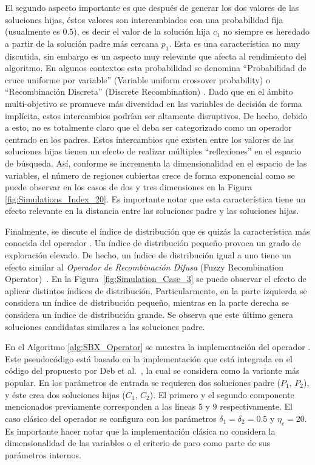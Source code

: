 El segundo aspecto importante es que después de generar los dos valores de las soluciones hijas, éstos valores son intercambiados con una probabilidad fija 
(usualmente es $0.5$), es decir el valor de la solución hija $c_1$ no siempre es heredado a partir de la solución padre más cercana $p_1$.
%
Esta es una característica no muy discutida, sin embargo es un aspecto muy relevante que afecta al rendimiento del algoritmo.
%
En algunos contextos esta probabilidad se denomina ``Probabilidad de cruce uniforme por variable'' (Variable uniform crossover probability) \cite{tuvsar2007differential} 
o ``Recombinación Discreta'' (Discrete Recombination) \cite{muhlenbein1993predictive}.
%
Dado que en el ámbito multi-objetivo se promueve más diversidad en las variables de decisión de forma implícita, estos intercambios podrían ser altamente disruptivos.
%
De hecho, debido a esto, no es totalmente claro que el \SBX{} deba ser categorizado como un operador centrado en los padres.
%
Estos intercambios que existen entre los valores de las soluciones hijas tienen un efecto de realizar múltiples ``reflexiones'' en el espacio de búsqueda.
%
Así, conforme se incrementa la dimensionalidad en el espacio de las variables, el número de regiones cubiertas crece de forma exponencial como se puede observar en 
los casos de dos y tres dimensiones en la Figura \ref{fig:Simulations_Index_20}.
%
Es importante notar que esta característica tiene un efecto relevante en la distancia entre las soluciones padre y las soluciones hijas.

Finalmente, se discute el índice de distribución que es quizás la característica más conocida del operador \SBX{}.
%
Un índice de distribución pequeño provoca un grado de exploración elevado.
%
De hecho, un índice de distribución igual a uno tiene un efecto similar al \textit{Operador de Recombinación Difusa} (Fuzzy Recombination Operator)~\cite{voigt1995fuzzy}.
%
En la Figura~\ref{fig:Simulation_Case_3} se puede observar el efecto de aplicar distintos índices de distribución.
%
Particularmente, en la parte izquierda se considera un índice de distribución pequeño, mientras en la parte derecha se considera un índice de distribución grande.
%
Se observa que este último genera soluciones candidatas similares a las soluciones padre.

En el Algoritmo \ref{alg:SBX_Operator} se muestra la implementación del operador \SBX{}.
%
Este pseudocódigo está basado en la implementación que está integrada en el código del \NSGAII{} propuesto por Deb et al.~\cite{Joel:NSGAII}, 
la cual se considera como la variante más popular.
%
En los parámetros de entrada se requieren dos soluciones padre ($P_1$, $P_2$), y éste crea dos soluciones hijas ($C_1$, $C_2$).
%
El primero y el segundo componente mencionados previamente corresponden a las líneas 5 y 9 respectivamente.
%
El caso clásico del operador \SBX{} se configura con los parámetros $\delta_1 = \delta_2 = 0.5$ y $\eta_c = 20$.
%
Es importante hacer notar que la implementación clásica no considera la dimensionalidad de las variables o el criterio de paro como parte de sus parámetros internos.

